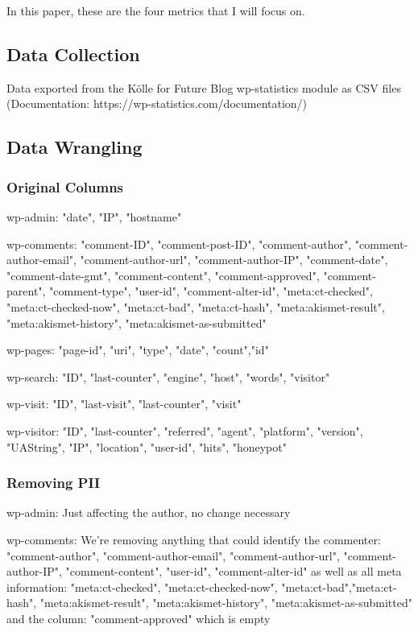 In this paper, these are the four metrics that I will focus on.

\subsection{Data Collection}

Data exported from the Kölle for Future Blog wp-statistics module as CSV files (Documentation: https://wp-statistics.com/documentation/)

\subsection{Data Wrangling}

\subsubsection{Original Columns}

wp-admin: "date", "IP", "hostname"

wp-comments: "comment-ID", "comment-post-ID", "comment-author", "comment-author-email", "comment-author-url", "comment-author-IP", "comment-date", "comment-date-gmt", "comment-content", "comment-approved", "comment-parent", "comment-type", "user-id", "comment-alter-id", "meta:ct-checked", "meta:ct-checked-now", "meta:ct-bad", "meta:ct-hash", "meta:akismet-result", "meta:akismet-history", "meta:akismet-as-submitted"

wp-pages: "page-id", "uri", "type", "date", "count","id"

wp-search: "ID", "last-counter", "engine", "host", "words", "visitor"

wp-visit: "ID", "last-visit", "last-counter", "visit"

wp-visitor: "ID", "last-counter", "referred", "agent", "platform", "version", "UAString", "IP", "location", "user-id", "hits", "honeypot"

\subsubsection{Removing PII}

wp-admin: Just affecting the author, no change necessary

wp-comments: We're removing anything that could identify the commenter: "comment-author", "comment-author-email", "comment-author-url", "comment-author-IP", "comment-content", "user-id", "comment-alter-id" as well as all meta information: "meta:ct-checked", "meta:ct-checked-now", "meta:ct-bad","meta:ct-hash", "meta:akismet-result", "meta:akismet-history", "meta:akismet-as-submitted" and the column: "comment-approved" which is empty

